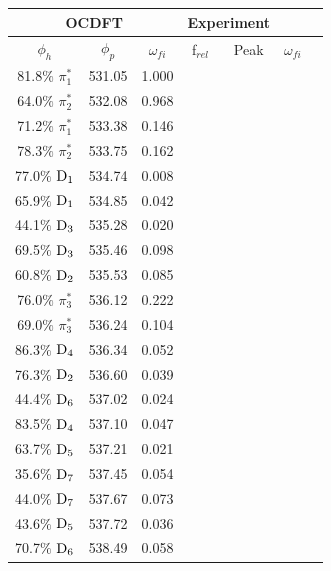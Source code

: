 \documentclass[12pt]{article}
\begin{document}
 \begin{table}
 \centering
     \begin{tabular}{c@{\hskip 0.22in}c@{\hskip 0.22in}c@{\hskip 0.22in}c@{\hskip 0.52in}c@{\hskip 0.22in}c@{\hskip 0.22in}c}
     \hline
     \hline
   \multicolumn{3}{c}{OCDFT} &\multicolumn{2}{c}{Experiment} \\
   \hline
 $\phi_h$ &  $\phi_p$ & $\omega_{fi}$ & f$_{rel}$ & Peak &  $\omega_{fi}$   \\
   \hline
   81.8$\%$ $\pi_1^*$  & 531.05 & 1.000 \\
   64.0$\%$ $\pi_2^*$   & 532.08 & 0.968 \\
   71.2$\%$ $\pi_1^*$   & 533.38 & 0.146 \\
   78.3$\%$ $\pi_2^*$   & 533.75 & 0.162 \\
   77.0$\%$ $\rm D_1$   & 534.74 & 0.008 \\
   65.9$\%$ $\rm D_1$   & 534.85 & 0.042 \\
   44.1$\%$ $\rm D_3$   & 535.28 & 0.020 \\
   69.5$\%$ $\rm D_3$   & 535.46 & 0.098 \\
   60.8$\%$ $\rm D_2$   & 535.53 & 0.085 \\
   76.0$\%$ $\pi_3^*$   & 536.12 & 0.222 \\
   69.0$\%$ $\pi_3^*$   & 536.24 & 0.104 \\
   86.3$\%$ $\rm D_4$   & 536.34 & 0.052 \\
   76.3$\%$ $\rm D_2$   & 536.60 & 0.039 \\
   44.4$\%$ $\rm D_6$   & 537.02 & 0.024 \\
   83.5$\%$ $\rm D_4$   & 537.10 & 0.047 \\
   63.7$\%$ $\rm D_5$   & 537.21 & 0.021 \\
   35.6$\%$ $\rm D_7$   & 537.45 & 0.054 \\
   44.0$\%$ $\rm D_7$   & 537.67 & 0.073 \\
   43.6$\%$ $\rm D_5$   & 537.72 & 0.036 \\
   70.7$\%$ $\rm D_6$   & 538.49 & 0.058 \\
   \end{tabular}
   \end{table}
\end{document}

